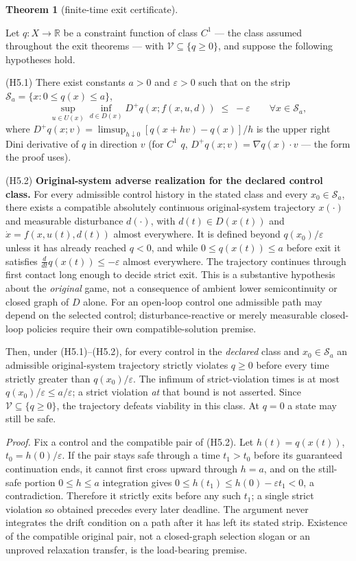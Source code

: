 \documentclass[10pt,twocolumn]{article}
\theoremstyle{definition}
\newtheorem{theorem}{Theorem}
\begin{document}
\begin{theorem}[finite-time exit certificate]\label{calc-thm:exit}

Let \(q : X \to \mathbb{R}\) be a constraint function of class \(C^1\) --- the class assumed throughout the exit theorems --- with
\(\mathcal{V} \subseteq \{ q \ge 0 \}\), and suppose the following
hypotheses hold.

(H5.1) There exist constants \(a > 0\) and \(\varepsilon > 0\) such that
on the strip \(\mathcal{S}_a = \{ x : 0 \le q(x) \le a \}\),
\[\sup_{u \in U(x)} \inf_{d \in D(x)} D^+ q(x; f(x,u,d)) \;\le\; -\varepsilon \qquad \forall x \in \mathcal{S}_a, \tag{4}\]
where \(D^+ q(x; v) = \limsup_{h \downarrow 0} [q(x + hv) - q(x)]/h\) is
the upper right Dini derivative of \(q\) in direction \(v\) (for \(C^1\)
\(q\), \(D^+ q(x; v) = \nabla q(x) \cdot v\) --- the form the proof
uses).

(H5.2) \textbf{Original-system adverse realization for the declared control class.} For every admissible control history in the stated class and every \(x_0\in\mathcal S_a\), there exists a compatible absolutely continuous original-system trajectory \(x(\cdot)\) and measurable disturbance \(d(\cdot)\), with \(d(t)\in D(x(t))\) and \(\dot x=f(x,u(t),d(t))\) almost everywhere. It is defined beyond \(q(x_0)/\varepsilon\) unless it has already reached \(q<0\), and while \(0\le q(x(t))\le a\) before exit it satisfies \(\frac{d}{dt}q(x(t))\le-\varepsilon\) almost everywhere. The trajectory continues through first contact long enough to decide strict exit. This is a substantive hypothesis about the \emph{original} game, not a consequence of ambient lower semicontinuity or closed graph of \(D\) alone. For an open-loop control one admissible path may depend on the selected control; disturbance-reactive or merely measurable closed-loop policies require their own compatible-solution premise.

Then, under (H5.1)--(H5.2), for every control in the \emph{declared} class and \(x_0\in\mathcal S_a\) an admissible original-system trajectory strictly violates \(q\ge0\) before every time strictly greater than \(q(x_0)/\varepsilon\). The infimum of strict-violation times is at most \(q(x_0)/\varepsilon\le a/\varepsilon\); a strict violation \emph{at} that bound is not asserted. Since \(\mathcal V\subseteq\{q\ge0\}\), the trajectory defeats viability in this class. At \(q=0\) a state may still be safe.
\end{theorem}

\emph{Proof.} Fix a control and the compatible pair of (H5.2). Let \(h(t)=q(x(t))\), \(t_0=h(0)/\varepsilon\). If the pair stays safe through a time \(t_1>t_0\) before its guaranteed continuation ends, it cannot first cross upward through \(h=a\), and on the still-safe portion \(0\le h\le a\) integration gives \(0\le h(t_1)\le h(0)-\varepsilon t_1<0\), a contradiction. Therefore it strictly exits before any such \(t_1\); a single strict violation so obtained precedes every later deadline. The argument never integrates the drift condition on a path after it has left its stated strip. Existence of the compatible original pair, not a closed-graph selection slogan or an unproved relaxation transfer, is the load-bearing premise.
\end{document}
